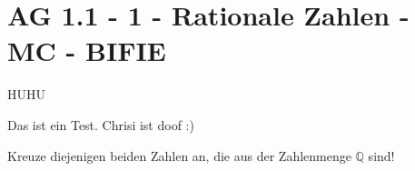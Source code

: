 \section{AG 1.1 - 1 - Rationale Zahlen - MC - BIFIE}
HUHU
\begin{beispiel}[AG 1.1]{1} %
				Das ist ein Test. Chrisi ist doof :)
				
				Kreuze diejenigen beiden Zahlen an, die aus der Zahlenmenge $\mathbb{Q}$ sind!
\end{beispiel}
